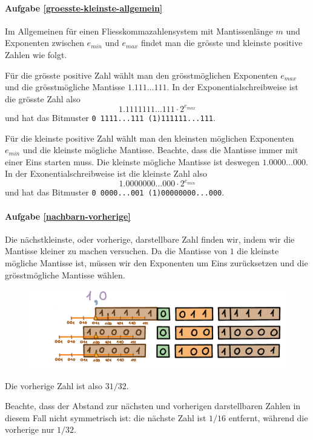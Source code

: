 \paragraph{Aufgabe \ref{groesste-kleinste-allgemein}}

Im Allgemeinen für einen Fliesskommazahlensystem mit Mantissenlänge \(m\) und Exponenten zwischen \(e_{min}\) und \(e_{max}\) findet man die grösste und kleinste positive Zahlen wie folgt.

Für die grösste positive Zahl wählt man den grösstmöglichen Exponenten \(e_{max}\) und die grösstmögliche Mantisse \(1.111 \ldots 111\). In der Exponentialschreibweise ist die grösste Zahl also 
\[1.1111111 \ldots 111 \cdot 2^{e_{max}}\]
und hat das Bitmuster \texttt{0 1111...111 (1)111111...111}.

Für die kleinste positive Zahl wählt man den kleinsten möglichen Exponenten \(e_{min}\) und die kleinste mögliche Mantisse. Beachte, dass die Mantisse immer mit einer Eins starten muss. Die kleinste mögliche Mantisse ist deswegen \(1.0000 \ldots 000\). In der Exonentialschreibweise ist die kleinste Zahl also
\[1.0000000 \ldots 000 \cdot 2^{e_{min}}\]
und hat das Bitmuster \texttt{0 0000...001 (1)00000000...000}.

\paragraph{Aufgabe \ref{nachbarn-vorherige}}
Die nächstkleinste, oder vorherige, darstellbare Zahl finden wir, indem wir die Mantisse kleiner zu machen versuchen. Da die Mantisse von \(1\) die kleinste mögliche Mantisse ist, müssen wir den Exponenten um Eins zurücksetzen und die grösstmögliche Mantisse wählen.

\begin{figure}[H]
\centering
\includegraphics[width=\linewidth]{Pictures/Nachbarn1_P.png} 
\end{figure}
Die vorherige Zahl ist also \(31/32\).

Beachte, dass der Abstand zur nächsten und vorherigen darstellbaren Zahlen in diesem Fall nicht symmetrisch ist: die nächste Zahl ist \(1/16\) entfernt, während die vorherige nur \(1/32\).

